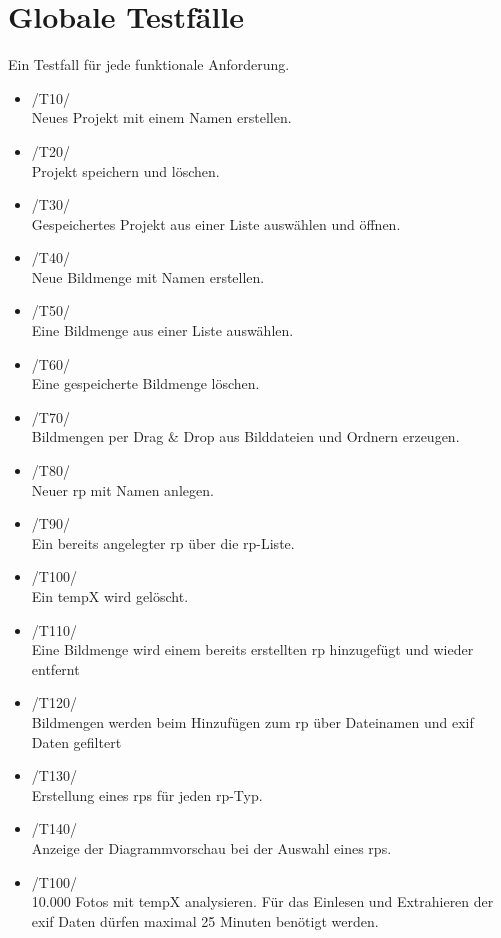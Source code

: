 \section{Globale Testfälle}

Ein Testfall für jede funktionale Anforderung.

\begin{itemize}
	\item /T10/\\ Neues Projekt mit einem Namen erstellen.
	\item /T20/\\ Projekt speichern und löschen.
	\item /T30/\\ Gespeichertes Projekt aus einer Liste auswählen und öffnen.
	\item /T40/\\ Neue Bildmenge mit Namen erstellen.
	\item /T50/\\ Eine Bildmenge aus einer Liste auswählen.
	\item /T60/\\ Eine gespeicherte Bildmenge löschen.
	\item /T70/\\ Bildmengen per Drag \& Drop aus Bilddateien und Ordnern erzeugen.
	\item /T80/\\ Neuer \gls{rp} mit Namen anlegen.
	\item /T90/\\ Ein bereits angelegter \gls{rp} über die \gls{rp}-Liste.
	\item /T100/\\ Ein \gls{tempX} wird gelöscht.
	\item /T110/\\ Eine Bildmenge wird einem bereits erstellten \gls{rp} hinzugefügt und wieder entfernt
	\item /T120/\\ Bildmengen werden beim Hinzufügen zum \gls{rp} über Dateinamen und \gls{exif} Daten gefiltert
	\item /T130/\\ Erstellung eines \gls{rp}s für jeden \gls{rp}-Typ.
	\item /T140/\\ Anzeige der Diagrammvorschau bei der Auswahl eines \gls{rp}s. 
	\item /T100/\\ 10.000 Fotos mit \gls{tempX} analysieren. Für das Einlesen und Extrahieren der \gls{exif} Daten dürfen maximal 25 Minuten benötigt werden.
\end{itemize}